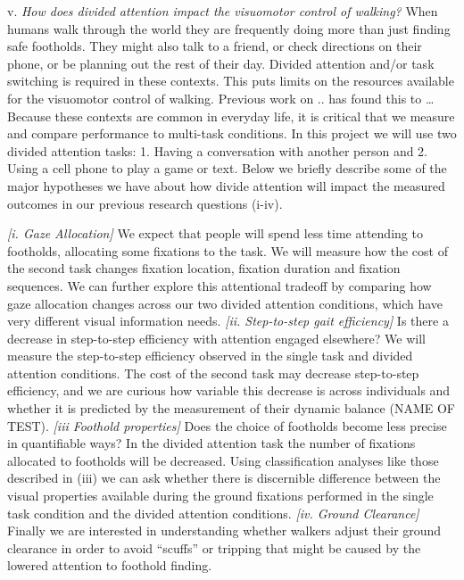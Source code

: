 \documentclass[
]{article}
\begin{document}
v. \emph{How does divided attention impact the visuomotor control of
walking?} When humans walk through the world they are frequently doing
more than just finding safe footholds. They might also talk to a friend,
or check directions on their phone, or be planning out the rest of their
day. Divided attention and/or task switching is required in these
contexts. This puts limits on the resources available for the visuomotor
control of walking. Previous work on .. has found this to \ldots{}
Because these contexts are common in everyday life, it is critical that
we measure and compare performance to multi-task conditions. In this
project we will use two divided attention tasks: 1. Having a
conversation with another person and 2. Using a cell phone to play a
game or text. Below we briefly describe some of the major hypotheses we
have about how divide attention will impact the measured outcomes in our
previous research questions (i-iv).

\emph{{[}i. Gaze Allocation{]}} We expect that people will spend less
time attending to footholds, allocating some fixations to the task. We
will measure how the cost of the second task changes fixation location,
fixation duration and fixation sequences. We can further explore this
attentional tradeoff by comparing how gaze allocation changes across our
two divided attention conditions, which have very different visual
information needs. \emph{{[}ii. Step-to-step gait efficiency{]}} Is
there a decrease in step-to-step efficiency with attention engaged
elsewhere? We will measure the step-to-step efficiency observed in the
single task and divided attention conditions. The cost of the second
task may decrease step-to-step efficiency, and we are curious how
variable this decrease is across individuals and whether it is predicted
by the measurement of their dynamic balance (NAME OF TEST). \emph{{[}iii
Foothold properties{]}} Does the choice of footholds become less precise
in quantifiable ways? In the divided attention task the number of
fixations allocated to footholds will be decreased. Using classification
analyses like those described in (iii) we can ask whether there is
discernible difference between the visual properties available during
the ground fixations performed in the single task condition and the
divided attention conditions. \emph{{[}iv. Ground Clearance{]}} Finally
we are interested in understanding whether walkers adjust their ground
clearance in order to avoid ``scuffs'' or tripping that might be caused
by the lowered attention to foothold finding.
\end{document}
